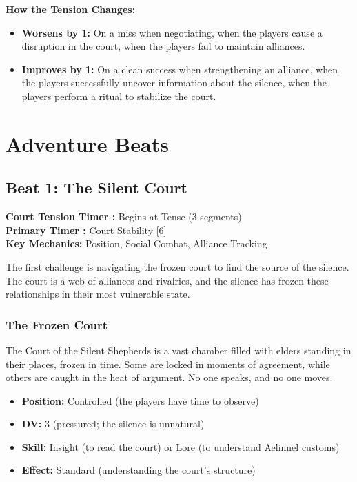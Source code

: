 \documentclass{article}
\begin{document}
\textbf{How the Tension Changes:}
\begin{itemize}
    \item \textbf{Worsens by 1:} On a miss when negotiating, when the players cause a disruption in the court, when the players fail to maintain alliances.
    \item \textbf{Improves by 1:} On a clean success when strengthening an alliance, when the players successfully uncover information about the silence, when the players perform a ritual to stabilize the court.
\end{itemize}

\section{Adventure Beats}

\subsection{Beat 1: The Silent Court}

\begin{mechanicbox}
\textbf{Court Tension Timer :} Begins at Tense (3 segments) \\
\textbf{Primary Timer :} Court Stability [6] \\
\textbf{Key Mechanics:} Position, Social Combat, Alliance Tracking
\end{mechanicbox}

The first challenge is navigating the frozen court to find the source of the silence. The court is a web of alliances and rivalries, and the silence has frozen these relationships in their most vulnerable state.

\subsubsection{The Frozen Court}

The Court of the Silent Shepherds is a vast chamber filled with elders standing in their places, frozen in time. Some are locked in moments of agreement, while others are caught in the heat of argument. No one speaks, and no one moves.

\begin{itemize}
    \item \textbf{Position:} Controlled (the players have time to observe)
    \item \textbf{DV:} 3 (pressured; the silence is unnatural)
    \item \textbf{Skill:} Insight (to read the court) or Lore (to understand Aelinnel customs)
    \item \textbf{Effect:} Standard (understanding the court's structure)
\end{itemize}
\end{document}
